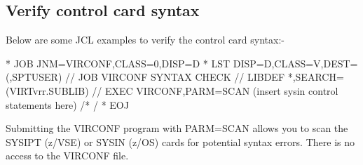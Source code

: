 \documentclass[letterpaper,10pt,english]{sphinxmanual}
\begin{document}
\subsection{Verify control card syntax}
\label{\detokenize{Installation_Guide:verify-control-card-syntax}}\label{\detokenize{Installation_Guide:index-157}}
Below are some JCL examples to verify the control card syntax:-

\begin{sphinxVerbatim}[commandchars=\\\{\}]
* \PYGZdl{}\PYGZdl{} JOB JNM=VIRCONF,CLASS=0,DISP=D
* \PYGZdl{}\PYGZdl{} LST DISP=D,CLASS=V,DEST=(,SPTUSER)
// JOB VIRCONF SYNTAX CHECK
// LIBDEF *,SEARCH=(VIRTvrr.SUBLIB)
// EXEC VIRCONF,PARM=\PYGZsq{}SCAN\PYGZsq{}
        (insert sysin control statements here)
/*
/\PYGZam{}
* \PYGZdl{}\PYGZdl{} EOJ
\end{sphinxVerbatim}


\begin{sphinxVerbatim}[commandchars=\\\{\}]
  
   
  
  
  
  
            
\end{sphinxVerbatim}


Submitting the VIRCONF program with PARM=SCAN allows you to scan the SYSIPT (z/VSE) or SYSIN (z/OS) cards for potential syntax errors. There is no access to the VIRCONF file.

\ignorespaces 
\end{document}
